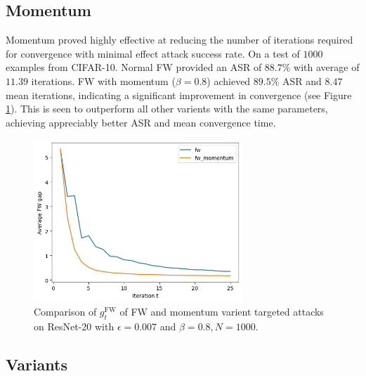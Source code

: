 \documentclass{article}
\begin{document}
\subsection{Momentum}

Momentum proved highly effective at reducing the number of iterations required for convergence with minimal effect attack success rate. On a test of $1000$ examples from CIFAR-10. Normal FW provided an ASR of $88.7\%$ with average of $11.39$ iterations. FW with momentum ($\beta = 0.8$) achieved $89.5\%$ ASR and $8.47$ mean iterations, indicating a significant improvement in convergence (see Figure \ref{fig:momentum}). This is seen to outperform all other varients with the same parameters, achieving appreciably better ASR and mean convergence time.

\begin{figure}[H]
    \centering
    \includegraphics[width=0.7\textwidth]{plots/momentum.png}
    \caption{Comparison of $g_t^\text{FW}$ of FW and momentum varient targeted attacks on ResNet-20 with $\epsilon = 0.007$ and $\beta = 0.8, N = 1000$.}
    \label{fig:momentum}
\end{figure}

\subsection{Variants}
\end{document}
